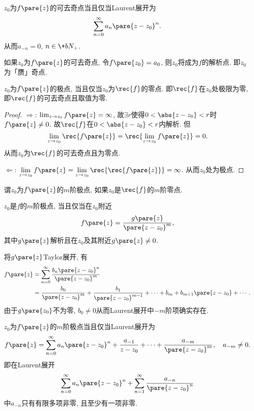 \documentclass{ctexart}
\begin{document}
\begin{theorem}
    $z_0$为$f\pare{z}$的可去奇点当且仅当Laurent展开为
    \[ \sum_{n=0}^\infty a_n\pare{z-z_0}^n. \]
    从而$a_{-n} = 0$, $n \in \+bN_+$.
\end{theorem}
\begin{remark}
    如果$z_0$为$f\pare{z}$的可去奇点, 令$f\pare{z_0} = a_0$, 则$z_0$将成为$f$的解析点. 即$z_0$为「赝」奇点.
\end{remark}
\begin{theorem}
    $z_0$为$f\pare{z}$的极点, 当且仅当$z_0$为$\displaystyle \rec{f}$的零点. 即$\displaystyle \rec{f}$在$z_0$处极限为零, 即$\displaystyle \rec{f}$的可去奇点且取值为零.
\end{theorem}
\begin{proof}
    $\Rightarrow$: $\lim_{z\rightarrow z_0} f\pare{z} = \infty$, 故$\exists r$使得$0<\abs{z-z_0}<r$时$f\pare{z} \neq 0$. 故$\displaystyle \rec{f}$在$0<\abs{z-z_0}<r$内解析. 但
    \[ \lim_{z\rightarrow z_0} \rec{f\pare{z}} = \rec{\lim_{z\rightarrow z_0} f\pare{z}} = 0. \]
    从而$z_0$为$\displaystyle \rec{f}$的可去奇点且为零点.
    \par
    $\Leftarrow$: $\displaystyle \lim_{z\rightarrow z_0} f\pare{z} = \lim_{z\rightarrow z_0} \rec{\rec{f\pare{z}}} = \infty$. 从而$z_0$处为极点.
\end{proof}
\begin{theorem}
    谓$z_0$为$f\pare{z}$的$m$阶极点, 如果$z_0$是$\displaystyle \rec{f}$的$m$阶零点.
\end{theorem}
\begin{theorem}
    $z_0$是$f$的$m$阶极点, 当且仅当在$z_0$附近
    \[ f\pare{z} = \frac{g\pare{z}}{\pare{z-z_0}^m}, \]
    其中$g\pare{z}$解析且在$z_0$及其附近$g\pare{z}\neq 0$.
\end{theorem}
将$g\pare{z}$Taylor展开, 有
\begin{align*}
    f\pare{z} &= \sum_{n=0}^\infty \frac{b_n\pare{z-z_0}^n}{\pare{z-z_0}^m}\\ &= \frac{b_0}{\pare{z-z_0}^m} + \frac{b_1}{\pare{z-z_0}^{m-1}} + \cdots + b_m + b_{m+1}\pare{z-z_0} + \cdots.
\end{align*}
由于$g\pare{z_0}$不为零, $b_0\neq 0$从而Laurent展开中$-m$阶项确实存在.
\begin{theorem}
    $z_0$为$f\pare{z}$的$m$阶极点当且仅当Laurent展开为
    \[ f\pare{z} = \sum_{n=0}^\infty a_n\pare{z-z_0}^n + \frac{a_{-1}}{z-z_0} + \cdots + \frac{a_{-m}}{\pare{z-z_0}^m}, \quad a_{-m}\neq 0. \]
    即在Laurent展开
    \[ \sum_{n=0}^\infty a_n\pare{z-z_0}^n + \sum_{n=1}^\infty \frac{a_{-n}}{\pare{z-z_0}^n} \]
    中$a_{-n}$只有有限多项非零, 且至少有一项非零.
\end{theorem}
\end{document}
